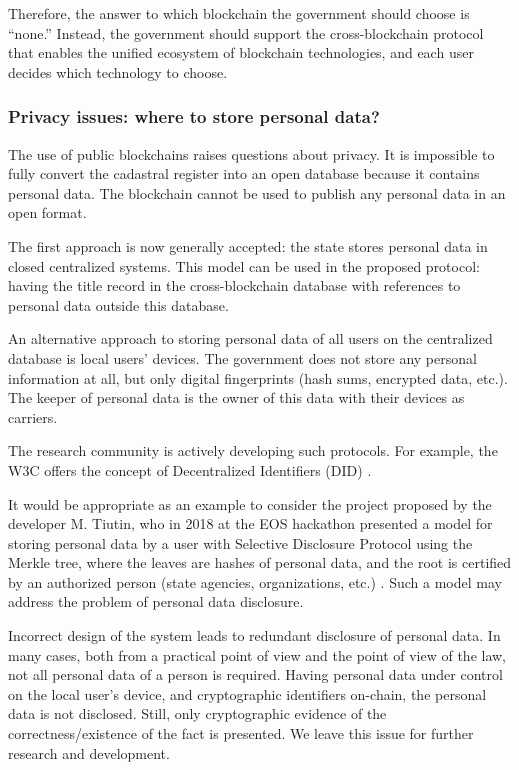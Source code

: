 \begin{multicols}{2}
Therefore, the answer to which blockchain the government should choose is “none.” Instead, the government should support the cross-blockchain protocol that enables the unified ecosystem of blockchain technologies, and each user decides which technology to choose.

\vspace{-.6cm}

\subsubsection{Privacy issues: where to store personal data?}\label{subsubsec-5.2.d}

\vspace{-.2cm}

The use of public blockchains raises questions about privacy. It is impossible to fully convert the cadastral register into an open database because it contains personal data. The blockchain cannot be used to publish any personal data in an open format.

The first approach is now generally accepted: the state stores personal data in closed centralized systems. This model can be used in the proposed protocol: having the title record in the cross-blockchain database with references to personal data outside this database.

An alternative approach to storing personal data of all users on the centralized database is local users’ devices. The government does not store any personal information at all, but only digital fingerprints (hash sums, encrypted data, etc.). The keeper of personal data is the owner of this data with their devices as carriers.

The research community is actively developing such protocols. For example, the W3C offers the concept of Decentralized Identifiers (DID) \cite{art1-key48}.

It would be appropriate as an example to consider the project proposed by the developer M. Tiutin, who in 2018 at the EOS hackathon presented a model for storing personal data by a user with Selective Disclosure Protocol using the Merkle tree, where the leaves are hashes of personal data, and the root is certified by an authorized person (state agencies, organizations, etc.) \cite{art1-key49}. Such a model may address the problem of personal data disclosure.

Incorrect design of the system leads to redundant disclosure of personal data. In many cases, both from a practical point of view and the point of view of the law, not all personal data of a person is required. Having personal data under control on the local user’s device, and cryptographic identifiers on-chain, the personal data is not disclosed. Still, only cryptographic evidence of the correctness/existence of the fact is presented. We leave this issue for further research and development.


\end{multicols}
